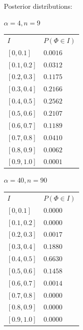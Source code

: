\documentclass{beamer}
\begin{document}
\begin{frame}{Posterior distributions:}
  \begin{center}
  \begin{minipage}{0.45\linewidth}
  \begin{exampleblock}{$\alpha=4, n=9$}
    \begin{tabular}{|l|l|}
      \hline
      $I$ & $P(\Phi \in I)$\\
          $[0, 0.1]$ & $0.0016$\\
          $[0.1, 0.2]$ & $0.0312$\\
          $[0.2, 0.3]$ & $0.1175$\\
          $[0.3, 0.4]$ & $0.2166$\\
          $[0.4, 0.5]$ & $0.2562$\\
          $[0.5, 0.6]$ & $0.2107$\\
          $[0.6, 0.7]$ & $0.1189$\\
          $[0.7, 0.8]$ & $0.0410$\\
          $[0.8, 0.9]$ & $0.0062$\\
          $[0.9, 1.0]$ & $0.0001$\\
          \hline
    \end{tabular}
  \end{exampleblock}
  \end{minipage}
  \begin{minipage}{0.45\linewidth}
    \begin{exampleblock}{$\alpha=40, n=90$}
      \begin{tabular}{|l|l|}
      \hline
      $I$ & $P(\Phi \in I)$\\
      $[0, 0.1]$ & $0.0000$\\
      $[0.1, 0.2]$ & $0.0000$\\
      $[0.2, 0.3]$ & $0.0017$\\
      $[0.3, 0.4]$ & $0.1880$\\
      $[0.4, 0.5]$ & $0.6630$\\
      $[0.5, 0.6]$ & $0.1458$\\
      $[0.6, 0.7]$ & $0.0014$\\
      $[0.7, 0.8]$ & $0.0000$\\
      $[0.8, 0.9]$ & $0.0000$\\
      $[0.9, 1.0]$ & $0.0000$\\
      \hline
    \end{tabular}
    \end{exampleblock}
  \end{minipage}
  \end{center}
\end{frame}
  
\end{document}
